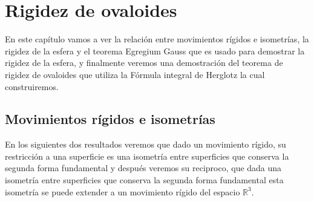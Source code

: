 \chapter{Rigidez de ovaloides}





${ }$\\

En este capítulo vamos a ver la relación entre movimientos rígidos e isometrías, la rigidez de la esfera y el teorema Egregium Gauss que es usado para demostrar la rigidez de la esfera, y finalmente veremos una demostración del teorema de rigidez de ovaloides que utiliza la Fórmula integral de Herglotz la cual construiremos.
${ }$\\


	${ }$\\
\section{Movimientos rígidos e isometrías}
	${ }$\\

En los siguientes dos resultados veremos que dado un movimiento rígido, su restricción a una superficie es una isometría entre superficies que conserva la segunda forma fundamental y después veremos su reciproco, que dada una isometría entre superficies que conserva la segunda forma fundamental esta isometría se puede extender a un movimiento rígido del espacio $\mathbb{R}^3$.
${ }$\\

